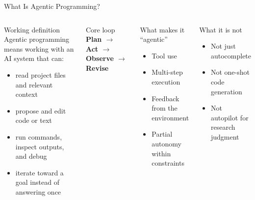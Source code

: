 \documentclass[aspectratio=169,10pt]{beamer}
\begin{document}
\begin{frame}{What Is Agentic Programming?}
\small
\begin{columns}[T]
\begin{block}{Working definition}
Agentic programming means working with an AI system that can:
\begin{itemize}\itemsep2pt
    \item read project files and relevant context
    \item propose and edit code or text
    \item run commands, inspect outputs, and debug
    \item iterate toward a goal instead of answering once
\end{itemize}
\end{block}

\begin{alertblock}{Core loop}
\centering
\textbf{Plan $\rightarrow$ Act $\rightarrow$ Observe $\rightarrow$ Revise}
\end{alertblock}

\begin{block}{What makes it ``agentic''}
\begin{itemize}\itemsep2pt
    \item Tool use
    \item Multi-step execution
    \item Feedback from the environment
    \item Partial autonomy within constraints
\end{itemize}
\end{block}

\begin{block}{What it is not}
\begin{itemize}\itemsep2pt
    \item Not just autocomplete
    \item Not one-shot code generation
    \item Not autopilot for research judgment
\end{itemize}
\end{block}
\end{columns}
\end{frame}
\end{document}
